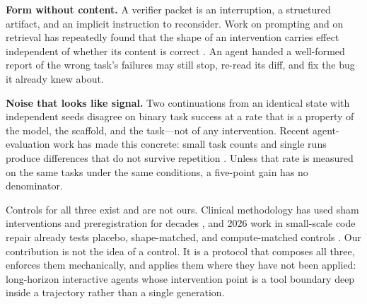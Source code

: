 \documentclass{article}
\begin{document}
\textbf{Form without content.} A verifier packet is an interruption, a
structured artifact, and an implicit instruction to reconsider. Work on
prompting and on retrieval has repeatedly found that the shape of an
intervention carries effect independent of whether its content is correct
\cite{min_rethinkingdemonstrations_2022,iscan_formnotcontent_2026}. An agent
handed a well-formed report of the wrong task's failures may still stop,
re-read its diff, and fix the bug it already knew about.

\textbf{Noise that looks like signal.} Two continuations from an identical
state with independent seeds disagree on binary task success at a rate that is
a property of the model, the scaffold, and the task---not of any intervention.
Recent agent-evaluation work has made this concrete: small task counts and
single runs produce differences that do not survive repetition
\cite{card_littlepower_2020,miller_errorbars_2024,bjarnason_randomness_2026,huang_howmanytasks_2026}.
Unless that rate is measured on the same tasks under the same conditions, a
five-point gain has no denominator.

Controls for all three exist and are not ours. Clinical methodology has used
sham interventions and preregistration for decades \cite{ich_e10_2000}, and
2026 work in small-scale code repair already tests placebo, shape-matched, and
compute-matched controls
\cite{iscan_falsificationnotexposure_2026,iscan_formnotcontent_2026,iscan_scaffoldnotvocabulary_2026}.
Our contribution is not the idea of a control. It is a protocol that composes
all three, enforces them mechanically, and applies them where they have not
been applied: long-horizon interactive agents whose intervention point is a
tool boundary deep inside a trajectory rather than a single generation.
\end{document}
